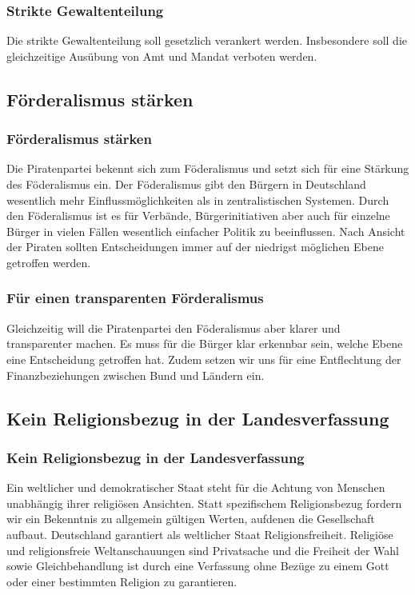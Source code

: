 \subsubsection{Strikte Gewaltenteilung}
\abstimmung
Die strikte Gewaltenteilung soll gesetzlich verankert werden. Insbesondere soll die gleichzeitige Ausübung von Amt und Mandat verboten werden.
 
\subsection*{Förderalismus stärken}

\subsubsection{Förderalismus stärken}
\abstimmung
Die Piratenpartei bekennt sich zum Föderalismus und setzt sich für eine Stärkung des Föderalismus ein. Der Föderalismus gibt den Bürgern in Deutschland wesentlich mehr Einflussmöglichkeiten als in zentralistischen Systemen. Durch den Föderalismus ist es für Verbände, Bürgerinitiativen aber auch für einzelne Bürger in vielen Fällen wesentlich einfacher Politik zu beeinflussen. Nach Ansicht der Piraten sollten Entscheidungen immer auf der niedrigst möglichen Ebene getroffen werden.

\subsubsection{Für einen transparenten Förderalismus}
\abstimmung
Gleichzeitig will die Piratenpartei den Föderalismus aber klarer und transparenter machen. Es muss für die Bürger klar erkennbar sein, welche Ebene eine Entscheidung getroffen hat. Zudem setzen wir uns für eine Entflechtung der Finanzbeziehungen zwischen Bund und Ländern ein.
 
\subsection*{Kein Religionsbezug in der Landesverfassung}

\subsubsection{Kein Religionsbezug in der Landesverfassung}
\abstimmung
Ein weltlicher und demokratischer Staat steht für die Achtung von Menschen unabhängig ihrer religiösen Ansichten. Statt spezifischem Religionsbezug fordern wir ein Bekenntnis zu allgemein gültigen Werten, aufdenen die Gesellschaft aufbaut. Deutschland garantiert als weltlicher Staat Religionsfreiheit. Religiöse und religionsfreie Weltanschauungen sind Privatsache und die Freiheit der Wahl sowie Gleichbehandlung ist durch eine Verfassung ohne Bezüge zu einem Gott oder einer bestimmten Religion zu garantieren.
 
